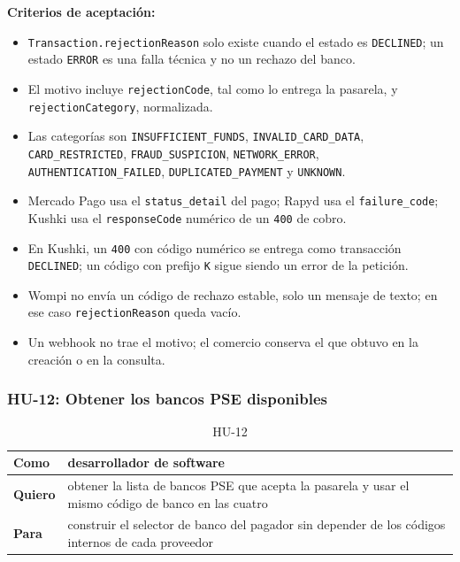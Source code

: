 \textbf{Criterios de aceptación:}
\begin{itemize}
  \item \texttt{Transaction.rejectionReason} solo existe cuando el estado es \texttt{DECLINED}; un estado \texttt{ERROR} es una falla técnica y no un rechazo del banco.
  \item El motivo incluye \texttt{rejectionCode}, tal como lo entrega la pasarela, y \texttt{rejectionCategory}, normalizada.
  \item Las categorías son \texttt{INSUFFICIENT\_FUNDS}, \texttt{INVALID\_CARD\_DATA}, \texttt{CARD\_RESTRICTED}, \texttt{FRAUD\_SUSPICION}, \texttt{NETWORK\_ERROR}, \texttt{AUTHENTICATION\_FAILED}, \texttt{DUPLICATED\_PAYMENT} y \texttt{UNKNOWN}.
  \item Mercado Pago usa el \texttt{status\_detail} del pago; Rapyd usa el \texttt{failure\_code}; Kushki usa el \texttt{responseCode} numérico de un \texttt{400} de cobro.
  \item En Kushki, un \texttt{400} con código numérico se entrega como transacción \texttt{DECLINED}; un código con prefijo \texttt{K} sigue siendo un error de la petición.
  \item Wompi no envía un código de rechazo estable, solo un mensaje de texto; en ese caso \texttt{rejectionReason} queda vacío.
  \item Un webhook no trae el motivo; el comercio conserva el que obtuvo en la creación o en la consulta.
\end{itemize}

\subsubsection{HU-12: Obtener los bancos PSE disponibles}
\begin{table}[H]
  \centering
  \renewcommand{\arraystretch}{1.2}
  \begin{tabularx}{\textwidth}{|l|X|}
    \hline
    \textbf{Como} & desarrollador de software \\
    \hline
    \textbf{Quiero} & obtener la lista de bancos PSE que acepta la pasarela y usar el mismo código de banco en las cuatro \\
    \hline
    \textbf{Para} & construir el selector de banco del pagador sin depender de los códigos internos de cada proveedor \\
    \hline
  \end{tabularx}
  \caption{HU-12}
  \label{tab:hu-12}
\end{table}

